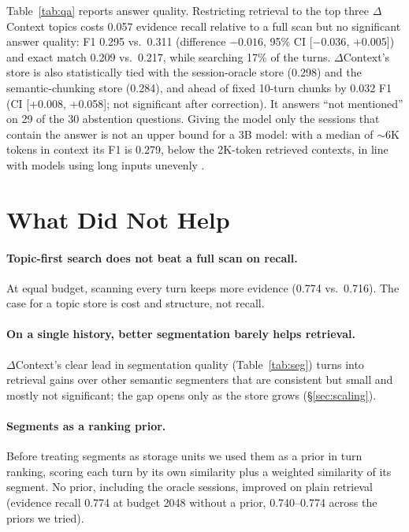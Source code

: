 \documentclass[11pt]{article}
\newcommand{\dc}{$\Delta$Context}
\begin{document}
Table~\ref{tab:qa} reports answer quality. Restricting retrieval to the top
three \dc{} topics costs 0.057 evidence recall relative to a full scan but no
significant answer quality: F1 0.295 vs.\ 0.311 (difference $-0.016$, 95\% CI
[$-0.036$, $+0.005$]) and exact match 0.209 vs.\ 0.217, while searching 17\% of
the turns. \dc{}'s store is also statistically tied with the session-oracle
store (0.298) and the semantic-chunking store (0.284), and ahead of fixed
10-turn chunks by 0.032 F1 (CI [+0.008, +0.058]; not significant after
correction). It answers ``not mentioned'' on 29 of the 30 abstention questions.
Giving the model only the sessions that contain the answer is not an upper
bound for a 3B model: with a median of $\sim$6K tokens in context its F1 is
0.279, below the 2K-token retrieved contexts, in line with models using long
inputs unevenly \citep{liu2024lost}.

\section{What Did Not Help}
\label{sec:negative}

\paragraph{Topic-first search does not beat a full scan on recall.} At equal
budget, scanning every turn keeps more evidence (0.774 vs.\ 0.716). The case for
a topic store is cost and structure, not recall.

\paragraph{On a single history, better segmentation barely helps retrieval.}
\dc{}'s clear lead in segmentation quality (Table~\ref{tab:seg}) turns into
retrieval gains over other semantic segmenters that are consistent but small
and mostly not significant; the gap opens only as the store grows
(\S\ref{sec:scaling}).

\paragraph{Segments as a ranking prior.} Before treating segments as storage
units we used them as a prior in turn ranking, scoring each turn by its own
similarity plus a weighted similarity of its segment. No prior, including the
oracle sessions, improved on plain retrieval (evidence recall 0.774 at budget
2048 without a prior, 0.740--0.774 across the priors we tried).
\end{document}
